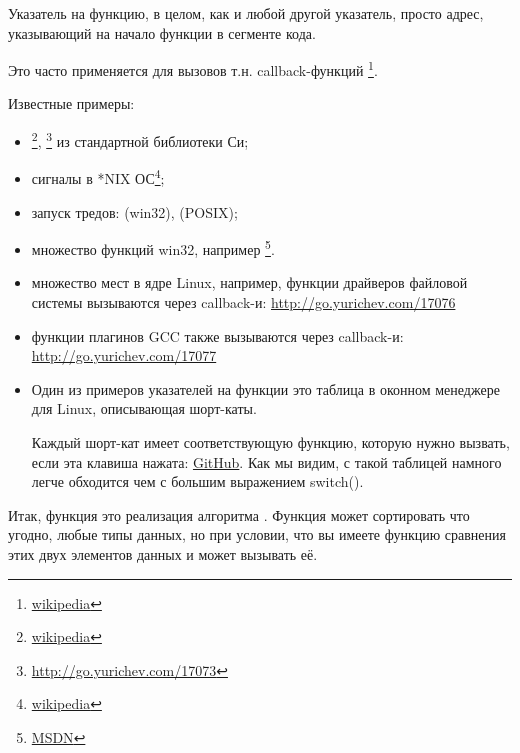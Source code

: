 \newcommand{\comp}{\TT{comp()}\xspace}
\label{sec:pointerstofunctions}

\myindex{\CLanguageElements!\Pointers}
Указатель на функцию, в целом, как и любой другой указатель, просто адрес, указывающий на начало функции 
в сегменте кода.

Это часто применяется для вызовов т.н. callback-функций \footnote{\href{http://go.yurichev.com/17071}{wikipedia}}.

Известные примеры:

\begin{itemize}
\item \qsort\footnote{\href{http://go.yurichev.com/17072}{wikipedia}},
{}\footnote{\url{http://go.yurichev.com/17073}} из стандартной библиотеки Си; 

\item сигналы в *NIX ОС\footnote{\href{http://go.yurichev.com/17074}{wikipedia}};

\item запуск тредов:  (win32),  (POSIX);

\item множество функций win32, например \footnote{\href{http://go.yurichev.com/17075}{MSDN}}.

\item множество мест в ядре Linux, например, функции драйверов файловой системы вызываются
через callback-и: 
\url{http://go.yurichev.com/17076}

\item функции плагинов GCC также вызываются через callback-и: 
\url{http://go.yurichev.com/17077}

\item Один из примеров указателей на функции это таблица в оконном менеджере  для Linux, описывающая шорт-каты.

Каждый шорт-кат имеет соответствующую функцию, которую нужно вызвать, если эта клавиша нажата: \href{http://go.yurichev.com/17078}{GitHub}.
Как мы видим, с такой таблицей намного легче обходится чем с большим выражением switch().

\end{itemize}

Итак, функция \qsort это реализация алгоритма . 
Функция может сортировать что угодно, 
любые типы данных, но при условии, что вы имеете функцию сравнения этих двух элементов данных и 
\qsort может вызывать её.

